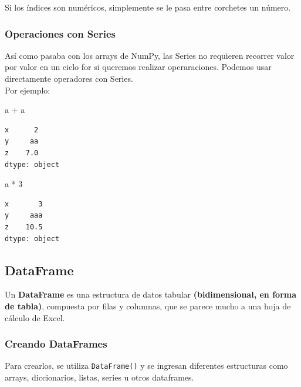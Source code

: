 \documentclass[
  letterpaper,
  DIV=11,
  numbers=noendperiod]{scrreprt}
\newenvironment{Shaded}{\begin{snugshade}}{\end{snugshade}}
\newcommand{\DecValTok}[1]{\textcolor[rgb]{0.68,0.00,0.00}{#1}}
\newcommand{\NormalTok}[1]{\textcolor[rgb]{0.00,0.23,0.31}{#1}}
\newcommand{\OperatorTok}[1]{\textcolor[rgb]{0.37,0.37,0.37}{#1}}
\begin{document}
Si los índices son numéricos, simplemente se le pasa entre corchetes un
número.

\subsubsection{Operaciones con Series}\label{operaciones-con-series}

Así como pasaba con los arrays de NumPy, las Series no requieren
recorrer valor por valor en un ciclo for si queremos realizar
operaraciones. Podemos usar directamente operadores con Series.\\
Por ejemplo:

\begin{Shaded}
\begin{Highlighting}[]
\NormalTok{a }\OperatorTok{+}\NormalTok{ a}
\end{Highlighting}
\end{Shaded}

\begin{verbatim}
x      2
y     aa
z    7.0
dtype: object
\end{verbatim}

\begin{Shaded}
\begin{Highlighting}[]
\NormalTok{a }\OperatorTok{*} \DecValTok{3}
\end{Highlighting}
\end{Shaded}

\begin{verbatim}
x       3
y     aaa
z    10.5
dtype: object
\end{verbatim}

\subsection{DataFrame}\label{dataframe}

Un \textbf{DataFrame} es una estructura de datos tabular
\textbf{(bidimensional, en forma de tabla)}, compuesta por filas y
columnas, que se parece mucho a una hoja de cálculo de Excel.

\subsubsection{Creando DataFrames}\label{creando-dataframes}

Para crearlos, se utiliza \texttt{DataFrame()} y se ingresan diferentes
estructuras como arrays, diccionarios, listas, series u otros
dataframes.
\end{document}

